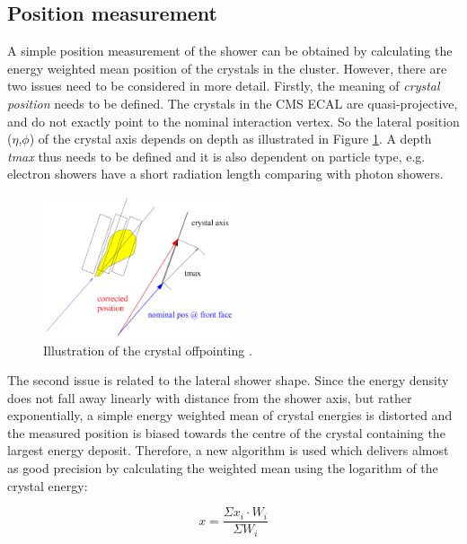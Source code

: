 \subsection*{Position measurement}\label{subsec:electron_photon_position}

A simple position measurement of the shower can be obtained by calculating the energy weighted mean position of the crystals in the cluster. However, there are two issues need to be considered in more detail. Firstly, the meaning of \textit{crystal position} needs to be defined. The crystals in the CMS ECAL are quasi-projective, and do not exactly point to the nominal interaction vertex. So the lateral position ($\eta$,$\phi$) of the crystal axis depends on depth as illustrated in Figure \ref{fig:cluster-position}. A depth \textit{tmax} thus needs to be defined and it is also dependent on particle type, e.g. electron showers have a short radiation length comparing with photon showers.

\begin{figure}[h!]
\begin{center}
\includegraphics[width=0.5\textwidth]{figures/Reconstruction/Electron_photon/Position.png}
\caption{Illustration of the crystal offpointing \cite{CMS-Note-2001-034}.}
\label{fig:cluster-position}
\end{center}
\end{figure}


The second issue is related to the lateral shower shape. Since the energy density does not fall away linearly with distance from the shower axis, but rather exponentially, a simple energy weighted mean of crystal energies is distorted and the measured position is biased towards the centre of the crystal containing the largest energy deposit. Therefore, a new algorithm is used which delivers almost as good precision by calculating the weighted mean using the logarithm of the crystal energy:

\begin{equation}
x=\frac{\Sigma x_{i}\cdot W_{i}}{\Sigma W_{i}}
\label{eq:logarithm}
\end{equation}

